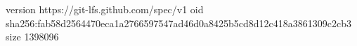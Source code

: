 version https://git-lfs.github.com/spec/v1
oid sha256:fab58d2564470eca1a2766597547ad46d0a8425b5cd8d12c418a3861309c2cb3
size 1398096
